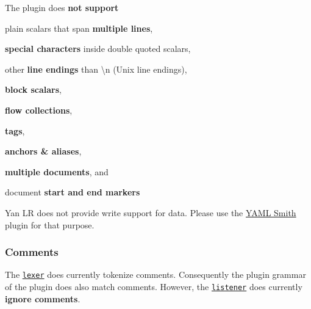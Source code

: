 \begin{DoxyItemize}
\item The plugin does {\bfseries not support}
\begin{DoxyItemize}
\item plain scalars that span {\bfseries multiple lines},
\item {\bfseries special characters} inside double quoted scalars,
\item other {\bfseries line endings} than {\ttfamily \textbackslash{}n} (Unix line endings),
\item {\bfseries block scalars},
\item {\bfseries flow collections},
\item {\bfseries tags},
\item {\bfseries anchors \& aliases},
\item {\bfseries multiple documents}, and
\item document {\bfseries start and end markers}
\end{DoxyItemize}
\item Yan LR does not provide write support for data. Please use the \hyperlink{md_src_plugins_yamlsmith_README_src_plugins_yamlsmith_README_md}{Y\+A\+ML Smith} plugin for that purpose.
\end{DoxyItemize}

\subsubsection*{Comments}

The \href{/home/markus/Projekte/Elektra/current/src/plugins/yanlr/yaml_lexer.cpp}{\tt lexer} does currently tokenize comments. Consequently the plugin grammar of the plugin does also match comments. However, the \href{/home/markus/Projekte/Elektra/current/src/plugins/yanlr/listener.cpp}{\tt listener} does currently {\bfseries ignore comments}. 